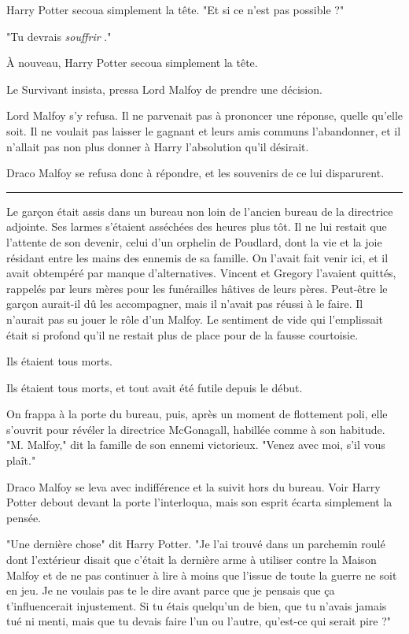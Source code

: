 Harry Potter secoua simplement la tête. "Et si ce n'est pas possible ?"

"Tu devrais \emph{souffrir} ."

À nouveau, Harry Potter secoua simplement la tête.

Le Survivant insista, pressa Lord Malfoy de prendre une décision.

Lord Malfoy s'y refusa. Il ne parvenait pas à prononcer une réponse, quelle qu'elle soit. Il ne voulait pas laisser le gagnant et leurs amis communs l'abandonner, et il n'allait pas non plus donner à Harry l'absolution qu'il désirait.

Draco Malfoy se refusa donc à répondre, et les souvenirs de ce lui disparurent.
\par\noindent\rule{\textwidth}{0.4pt}
Le garçon était assis dans un bureau non loin de l'ancien bureau de la directrice adjointe. Ses larmes s'étaient asséchées des heures plus tôt. Il ne lui restait que l'attente de son devenir, celui d'un orphelin de Poudlard, dont la vie et la joie résidant entre les mains des ennemis de sa famille. On l'avait fait venir ici, et il avait obtempéré par manque d'alternatives. Vincent et Gregory l'avaient quittés, rappelés par leurs mères pour les funérailles hâtives de leurs pères. Peut-être le garçon aurait-il dû les accompagner, mais il n'avait pas réussi à le faire. Il n'aurait pas su jouer le rôle d'un Malfoy. Le sentiment de vide qui l'emplissait était si profond qu'il ne restait plus de place pour de la fausse courtoisie.

Ils étaient tous morts.

Ils étaient tous morts, et tout avait été futile depuis le début.

On frappa à la porte du bureau, puis, après un moment de flottement poli, elle s'ouvrit pour révéler la directrice McGonagall, habillée comme à son habitude. "M. Malfoy," dit la famille de son ennemi victorieux. "Venez avec moi, s'il vous plaît."

Draco Malfoy se leva avec indifférence et la suivit hors du bureau. Voir Harry Potter debout devant la porte l'interloqua, mais son esprit écarta simplement la pensée.

"Une dernière chose" dit Harry Potter. "Je l'ai trouvé dans un parchemin roulé dont l'extérieur disait que c'était la dernière arme à utiliser contre la Maison Malfoy et de ne pas continuer à lire à moins que l'issue de toute la guerre ne soit en jeu. Je ne voulais pas te le dire avant parce que je pensais que ça t'influencerait injustement. Si tu étais quelqu'un de bien, que tu n'avais jamais tué ni menti, mais que tu devais faire l'un ou l'autre, qu'est-ce qui serait pire ?"

